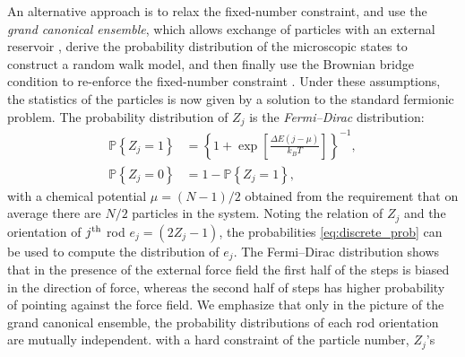 \documentclass[aps,showpacs,twocolumn,floatfix,prx,superscriptaddress]{revtex4-1}
\begin{document}
An alternative approach is to relax the fixed-number constraint, and use the
\emph{grand canonical ensemble}, which allows exchange of particles with an
external reservoir \cite{Chandler1987,Huang2001}, derive the probability
distribution of the microscopic states to construct a random walk model, and
then finally use the Brownian bridge condition to re-enforce the fixed-number
constraint \cite{Lin2015}. Under these assumptions, the statistics of the
particles is now given by a solution to the standard fermionic problem.  The
probability distribution of $Z_j$  is the {\em Fermi--Dirac} distribution:
\cite{Chandler1987,Lin2015}
\begin{subequations}
    \begin{align}
        \label{eq:discrete_prob}
        \mathbb{P} \left\{ Z_j = 1\right\} & =  \left\{1+\exp\left[\frac{ \Delta
                    E \left(j - \mu \right) }{k_B T}\right]\right\}^{-1}, \\
        \mathbb{P} \left\{ Z_j = 0\right\} & = 1 - \mathbb{P} \left\{ Z_j =
            1\right\},
    \end{align}
\end{subequations}
with a chemical potential $\mu = (N-1)/2$ obtained from the requirement that on
average there are $N/2$ particles in the system.  Noting the relation of $Z_j$
and the orientation of $j^{\rm th}$ rod $e_j = \left(2Z_j -1\right)$, the
probabilities \eqref{eq:discrete_prob} can be used to compute the distribution
of $e_j$. The Fermi--Dirac distribution shows that in the presence of the
external force field the first half of the steps is biased in the direction of
force, whereas the second half of steps has higher probability of pointing
against the force field.
We emphasize that only in the picture of the grand canonical ensemble, the
probability distributions of each rod orientation are mutually independent.%
with a hard constraint of the particle number, $Z_j$'s
\end{document}

